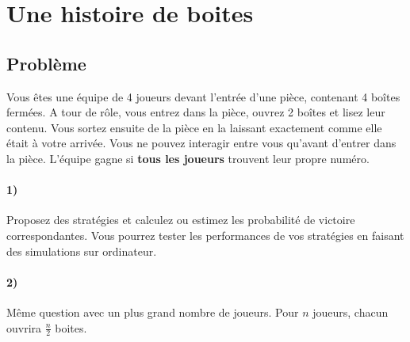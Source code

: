 \documentclass[a4paper,10pt,oneside]{article}
\begin{document}
\section{Une histoire de boites}

\subsection{Problème}
Vous êtes une équipe de 4 joueurs devant l'entrée d'une pièce, contenant 4 boîtes fermées.
A tour de rôle, vous entrez dans la pièce, ouvrez 2 boîtes et lisez leur contenu.
Vous sortez ensuite de la pièce en la laissant exactement comme elle était à votre arrivée. 
Vous ne pouvez interagir entre vous qu'avant d'entrer dans la pièce.
L'équipe gagne si \textbf{tous les joueurs} trouvent leur propre numéro. 



\paragraph*{1)}
Proposez des stratégies et calculez ou estimez les probabilité de victoire correspondantes.
Vous pourrez tester les performances de vos stratégies en faisant des simulations sur ordinateur.

\paragraph*{2)} Même question avec un plus grand nombre de joueurs. Pour $n$ joueurs, chacun ouvrira $\frac{n}{2}$ boites.
\end{document}
